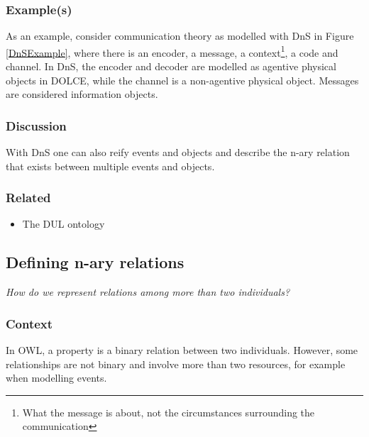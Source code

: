 \subsubsection{Example(s)}



As an example, consider communication theory \cite{Shannon} as modelled with \ac{DnS} in Figure \ref{DnSExample}, where there is an encoder, a message, a context\footnote{What the message is about, not the circumstances surrounding the communication}, a code and channel. In \ac{DnS}, the encoder and decoder are modelled as agentive physical objects in \ac{DOLCE}, while the channel is a non-agentive physical object. Messages are considered information objects. 



\subsubsection{Discussion}

With \ac{DnS} one can also reify events and objects and describe the n-ary relation that exists between multiple events and objects. 


\subsubsection{Related}

\begin{itemize}
	\item The \ac{DUL} ontology \cite{Gangemi2008}
\end{itemize}




\subsection{Defining n-ary relations}

\emph{How do we represent relations among more than two individuals?}

\subsubsection{Context}
In \ac{OWL}, a property is a binary relation between two individuals. However, some relationships are not binary and involve more than two resources, for example when modelling events.

